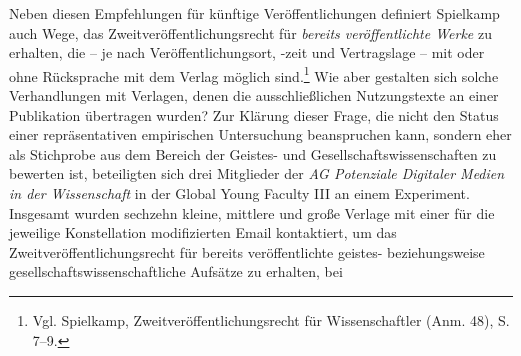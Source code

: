 \documentclass[a4paper,
fontsize=11pt,
oneside,
numbers=noperiodatend,
parskip=half-,
bibliography=totoc,
final
]{scrartcl}
\begin{document}
Neben diesen Empfehlungen für künftige Veröffentlichungen definiert
Spielkamp auch Wege, das Zweitveröffentlichungsrecht für \emph{bereits
veröffentlichte Werke} zu erhalten, die -- je nach Veröffentlichungsort,
-zeit und Vertragslage -- mit oder ohne Rücksprache mit dem Verlag
möglich sind.\footnote{Vgl. Spielkamp, Zweitveröffentlichungsrecht für
  Wissenschaftler (Anm. 48), S. 7--9.} Wie aber gestalten sich solche
Verhandlungen mit Verlagen, denen die ausschließlichen Nutzungstexte an
einer Publikation übertragen wurden? Zur Klärung dieser Frage, die nicht
den Status einer repräsentativen empirischen Untersuchung beanspruchen
kann, sondern eher als Stichprobe aus dem Bereich der Geistes- und
Gesellschaftswissenschaften zu bewerten ist, beteiligten sich drei
Mitglieder der \emph{AG Potenziale Digitaler Medien in der Wissenschaft}
in der Global Young Faculty III an einem Experiment. Insgesamt wurden
sechzehn kleine, mittlere und große Verlage mit einer für die jeweilige
Konstellation modifizierten Email kontaktiert, um das
Zweitveröffentlichungsrecht für bereits veröffentlichte geistes-
beziehungsweise gesellschaftswissenschaftliche Aufsätze zu erhalten, bei
\end{document}
